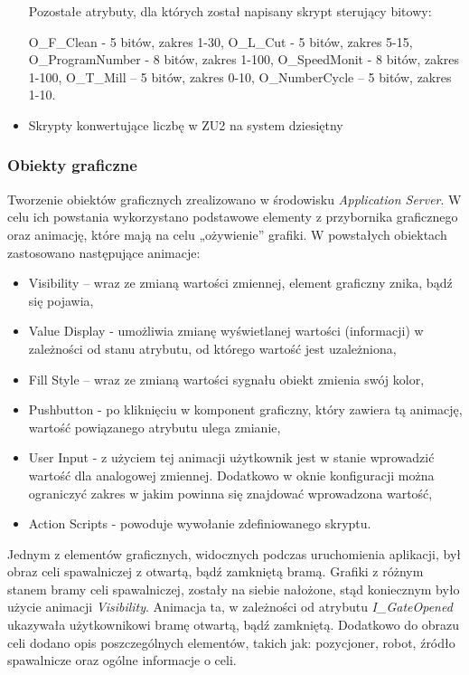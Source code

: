 \begin{itemize}
	Pozostałe atrybuty, dla których został napisany skrypt sterujący bitowy:
	
	\subitem O\_F\_Clean - 5 bitów, zakres 1-30,
	\subitem O\_L\_Cut - 5 bitów, zakres 5-15,
	\subitem O\_ProgramNumber - 8 bitów, zakres 1-100,
	\subitem O\_SpeedMonit - 8 bitów, zakres 1-100,
	\subitem O\_T\_Mill – 5 bitów, zakres 0-10,
	\subitem O\_NumberCycle – 5 bitów, zakres 1-10.
	
	
	\item Skrypty konwertujące liczbę w ZU2 na system dziesiętny 
	
	
\end{itemize}

\subsubsection{Obiekty graficzne}

Tworzenie obiektów graficznych zrealizowano w środowisku \textit{Application Server}. W celu ich powstania wykorzystano podstawowe elementy z przybornika graficznego oraz animację, które mają na celu „ożywienie” grafiki. W powstałych obiektach zastosowano następujące animacje:

\begin{itemize}
\item	Visibility –  wraz ze zmianą wartości zmiennej, element graficzny znika, bądź się pojawia,
\item	Value Display -  umożliwia zmianę wyświetlanej wartości (informacji) w zależności od stanu atrybutu, od którego wartość jest uzależniona,
\item	Fill Style – wraz ze zmianą wartości sygnału obiekt zmienia swój kolor,
\item	Pushbutton - po kliknięciu w komponent graficzny, który zawiera tą animację, wartość powiązanego atrybutu ulega zmianie,
\item	User Input  - z użyciem tej animacji użytkownik jest w stanie wprowadzić wartość dla analogowej zmiennej. Dodatkowo w oknie konfiguracji można ograniczyć zakres w jakim powinna się znajdować wprowadzona wartość,
\item	Action Scripts - powoduje wywołanie zdefiniowanego skryptu.
\end{itemize}


Jednym z elementów graficznych, widocznych podczas uruchomienia aplikacji, był obraz celi spawalniczej z otwartą, bądź zamkniętą bramą. Grafiki z różnym stanem bramy celi spawalniczej, zostały na siebie nałożone, stąd koniecznym było użycie animacji \textit{Visibility}. Animacja ta, w zależności od atrybutu \textit{I\_GateOpened} ukazywała użytkownikowi bramę otwartą, bądź zamkniętą. Dodatkowo do obrazu celi dodano opis poszczególnych elementów, takich jak: pozycjoner, robot, źródło spawalnicze oraz ogólne informacje o celi.   





